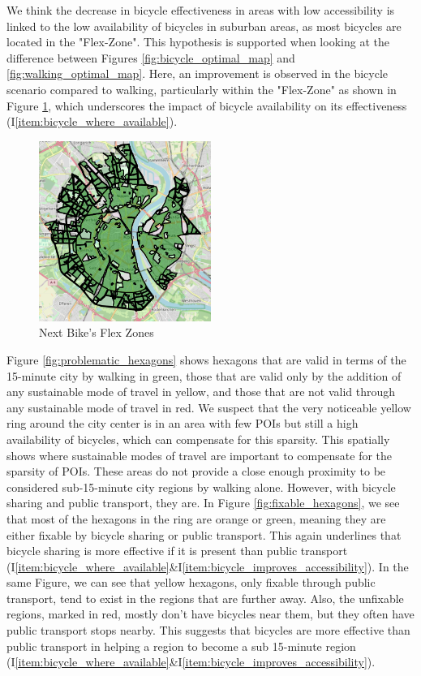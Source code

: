 We think the decrease in bicycle effectiveness in areas with low accessibility is linked to the low availability of bicycles in suburban areas, as most bicycles are located in the "Flex-Zone".
This hypothesis is supported when looking at the difference between Figures \ref{fig:bicycle_optimal_map} and \ref{fig:walking_optimal_map}. 
Here, an improvement is observed in the bicycle scenario compared to walking, particularly within the "Flex-Zone" as shown in Figure \ref{fig:flex_zones}, which underscores the impact of bicycle availability on its effectiveness (I\ref{item:bicycle_where_available}).
\begin{figure}
  \begin{center}
    \includegraphics[width=0.50\textwidth]{Figures/discussion/flex_zones.png}
  \end{center}
  \caption{Next Bike's Flex Zones}
  \label{fig:flex_zones}
\end{figure}

Figure \ref{fig:problematic_hexagons} shows hexagons that are valid in terms of the 15-minute city by walking in green, those that are valid only by the addition of any sustainable mode of travel in yellow, and those that are not valid through any sustainable mode of travel in red.
We suspect that the very noticeable yellow ring around the city center is in an area with few POIs but still a high availability of bicycles, which can compensate for this sparsity.
This spatially shows where sustainable modes of travel are important to compensate for the sparsity of POIs.
These areas do not provide a close enough proximity to be considered sub-15-minute city regions by walking alone.
However, with bicycle sharing and public transport, they are.
In Figure \ref{fig:fixable_hexagons}, we see that most of the hexagons in the ring are orange or green, meaning they are either fixable by bicycle sharing or public transport.
This again underlines that bicycle sharing is more effective if it is present than public transport (I\ref{item:bicycle_where_available}\&I\ref{item:bicycle_improves_accessibility}).
In the same Figure, we can see that yellow hexagons, only fixable through public transport, tend to exist in the regions that are further away.
Also, the unfixable regions, marked in red,  mostly don't have bicycles near them, but they often have public transport stops nearby.
This suggests that bicycles are more effective than public transport in helping a region to become a sub 15-minute region (I\ref{item:bicycle_where_available}\&I\ref{item:bicycle_improves_accessibility}).

